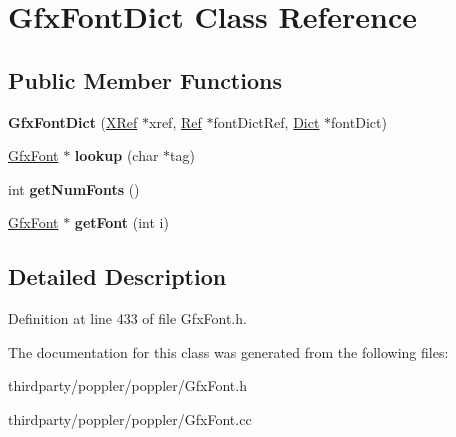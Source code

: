 \hypertarget{class_gfx_font_dict}{}\section{Gfx\+Font\+Dict Class Reference}
\label{class_gfx_font_dict}
\subsection*{Public Member Functions}
\begin{DoxyCompactItemize}
\item 
\mbox{\label{class_gfx_font_dict_abcf0a5172a7fd17d880df3051525157b}} 
{\bfseries Gfx\+Font\+Dict} (\hyperlink{class_x_ref}{X\+Ref} $\ast$xref, \hyperlink{struct_ref}{Ref} $\ast$font\+Dict\+Ref, \hyperlink{class_dict}{Dict} $\ast$font\+Dict)
\item 
\mbox{\label{class_gfx_font_dict_a15e57fbc5b985d8366dbc446c20a9c5a}} 
\hyperlink{class_gfx_font}{Gfx\+Font} $\ast$ {\bfseries lookup} (char $\ast$tag)
\item 
\mbox{\label{class_gfx_font_dict_a0faf4c34867e4f5db97c10b643fcfaa8}} 
int {\bfseries get\+Num\+Fonts} ()
\item 
\mbox{\label{class_gfx_font_dict_af9d73e562d84e4f3a692edafda1f62b9}} 
\hyperlink{class_gfx_font}{Gfx\+Font} $\ast$ {\bfseries get\+Font} (int i)
\end{DoxyCompactItemize}


\subsection{Detailed Description}


Definition at line 433 of file Gfx\+Font.\+h.



The documentation for this class was generated from the following files\+:\begin{DoxyCompactItemize}
\item 
thirdparty/poppler/poppler/Gfx\+Font.\+h\item 
thirdparty/poppler/poppler/Gfx\+Font.\+cc\end{DoxyCompactItemize}
